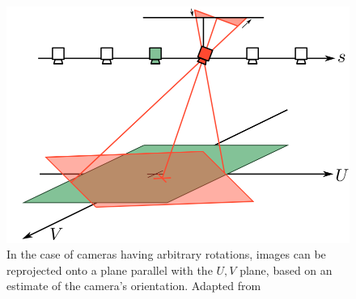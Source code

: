 \documentclass[../main.tex]{subfiles}
\begin{document}
\begin{figure}[H]
    \centering
    \includegraphics[width=0.8\linewidth]{images/coregistration-arbitrary-rotation}
    \caption{In the case of cameras having arbitrary rotations, images can be reprojected onto a plane parallel with the $U,V$ plane, based on an estimate of the camera's orientation. Adapted from \protect{}}
    \label{fig:coregistration-arbitrary-rotation}
\end{figure}
\end{document}
